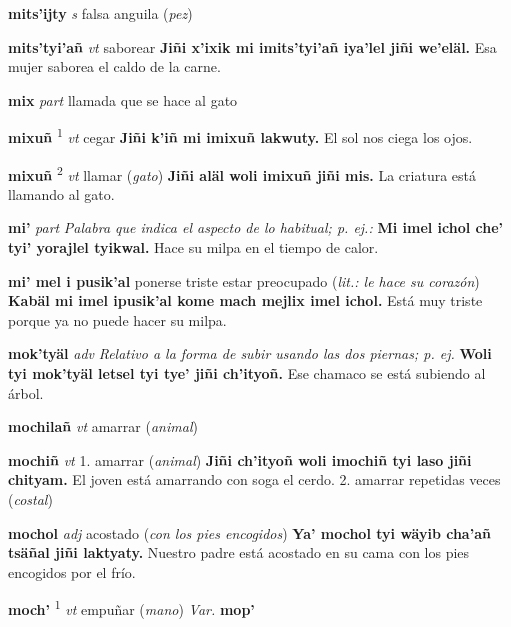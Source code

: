 \documentclass[10pt]{scrbook}
\newcommand{\entry}[1]{\textbf{#1}}
\newcommand{\onedefinition}[1]{#1.}
\newcommand{\defsuperscript}[1]{\textsuperscript{#1}}
\newcommand{\nontranslationdef}[1]{\textit{#1}}
\newcommand{\partofspeech}[1]{\textit{#1}}
\newcommand{\spanishtranslation}[1]{#1}
\newcommand{\clarification}[1]{(\textit{#1})}
\newcommand{\cholexample}[1]{\textbf{#1}}
\newcommand{\exampletranslation}[1]{#1}
\newcommand{\variation}[1]{\textit{Var.} \textbf{#1}}
\begin{document}
\begin{multicols}{2}
\entry{mits'ijty}
\partofspeech{s}
\spanishtranslation{falsa anguila}
\clarification{pez}

\entry{mits'tyi'añ}
\partofspeech{vt}
\spanishtranslation{saborear}
\cholexample{Jiñi x'ixik mi imits'tyi'añ iya'lel jiñi we'eläl.}
\exampletranslation{Esa mujer saborea el caldo de la carne.}

\entry{mix}
\partofspeech{part}
\spanishtranslation{llamada que se hace al gato}

\entry{mixuñ}
\defsuperscript{1}
\partofspeech{vt}
\spanishtranslation{cegar}
\cholexample{Jiñi k'iñ mi imixuñ lakwuty.}
\exampletranslation{El sol nos ciega los ojos.}

\entry{mixuñ}
\defsuperscript{2}
\partofspeech{vt}
\spanishtranslation{llamar}
\clarification{gato}
\cholexample{Jiñi aläl woli imixuñ jiñi mis.}
\exampletranslation{La criatura está llamando al gato.}

\entry{mi'}
\partofspeech{part}
\nontranslationdef{Palabra que indica el aspecto de lo habitual; p. ej.:}
\cholexample{Mi imel ichol che' tyi' yorajlel tyikwal.}
\exampletranslation{Hace su milpa en el tiempo de calor.}

\entry{mi' mel i pusik'al}
\spanishtranslation{ponerse triste}
\spanishtranslation{estar preocupado}
\clarification{lit.: le hace su corazón}
\cholexample{Kabäl mi imel ipusik'al kome mach mejlix imel ichol.}
\exampletranslation{Está muy triste porque ya no puede hacer su milpa.}

\entry{mok'tyäl}
\partofspeech{adv}
\nontranslationdef{Relativo a la forma de subir usando las dos piernas; p. ej.}
\cholexample{Woli tyi mok'tyäl letsel tyi tye' jiñi ch'ityoñ.}
\exampletranslation{Ese chamaco se está subiendo al árbol.}

\entry{mochilañ}
\partofspeech{vt}
\spanishtranslation{amarrar}
\clarification{animal}

\entry{mochiñ}
\partofspeech{vt}
\onedefinition{1}
\spanishtranslation{amarrar}
\clarification{animal}
\cholexample{Jiñi ch'ityoñ woli imochiñ tyi laso jiñi chityam.}
\exampletranslation{El joven está amarrando con soga el cerdo.}
\onedefinition{2}
\spanishtranslation{amarrar repetidas veces}
\clarification{costal}

\entry{mochol}
\partofspeech{adj}
\spanishtranslation{acostado}
\clarification{con los pies encogidos}
\cholexample{Ya' mochol tyi wäyib cha'añ tsäñal jiñi laktyaty.}
\exampletranslation{Nuestro padre está acostado en su cama con los pies encogidos por el frío.}

\entry{moch'}
\defsuperscript{1}
\partofspeech{vt}
\spanishtranslation{empuñar}
\clarification{mano}
\variation{mop'}


\end{multicols}
\end{document}
